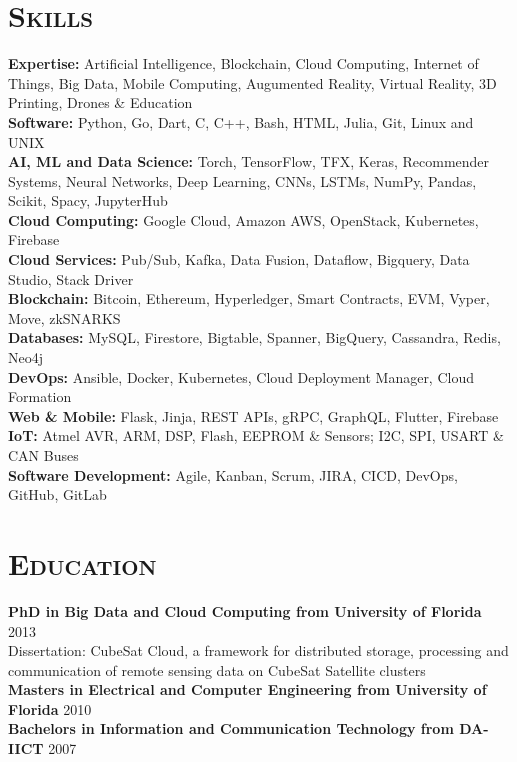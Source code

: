 \begin{resume}
\section{\textsc{Skills}}
{\bf Expertise:} Artificial Intelligence, Blockchain, Cloud Computing, Internet of Things, Big Data, Mobile Computing, Augumented Reality, Virtual Reality, 3D Printing, Drones \& Education
\\ {\bf Software:} Python, Go, Dart, C, C++, Bash, HTML, Julia, Git, Linux and UNIX
\\ {\bf AI, ML and Data Science:} Torch, TensorFlow, TFX, Keras, Recommender Systems, Neural Networks, Deep Learning, CNNs, LSTMs, NumPy, Pandas, Scikit, Spacy, JupyterHub
\\ {\bf Cloud Computing:} Google Cloud, Amazon AWS, OpenStack, Kubernetes, Firebase
\\ {\bf Cloud Services:} Pub/Sub, Kafka, Data Fusion, Dataflow, Bigquery, Data Studio, Stack Driver
\\ {\bf Blockchain:} Bitcoin, Ethereum, Hyperledger, Smart Contracts, EVM, Vyper, Move, zkSNARKS
\\ {\bf Databases:} MySQL, Firestore, Bigtable, Spanner, BigQuery, Cassandra, Redis, Neo4j
\\ {\bf DevOps:} Ansible, Docker, Kubernetes, Cloud Deployment Manager, Cloud Formation
\\ {\bf Web \& Mobile:} Flask, Jinja, REST APIs, gRPC, GraphQL, Flutter, Firebase
\\ {\bf IoT:} Atmel AVR, ARM, DSP, Flash, EEPROM \& Sensors; I2C, SPI, USART \& CAN Buses
\\ {\bf Software Development:} Agile, Kanban, Scrum, JIRA, CICD, DevOps, GitHub, GitLab


\section{\textsc{Education}}
\textbf{PhD in Big Data and Cloud Computing from University of Florida} \hfill 2013 \\
Dissertation: CubeSat Cloud, a framework for distributed storage, processing and communication of remote sensing data on CubeSat Satellite clusters\\
\textbf{Masters in Electrical and Computer Engineering from University of Florida} \hfill 2010 \\
\textbf{Bachelors in Information and Communication Technology from DA-IICT} \hfill 2007


\end{resume}
